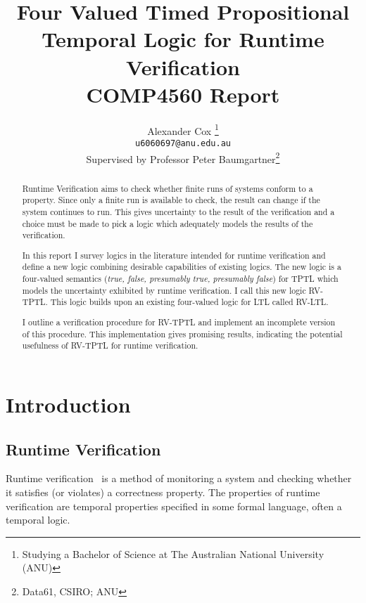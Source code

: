 \documentclass[a4paper]{article}
\title{
  Four Valued Timed Propositional Temporal Logic for Runtime Verification\\
  \normalsize{} COMP4560 Report
}
\author{
  Alexander Cox
  \thanks{Studying a Bachelor of Science at The Australian National University (ANU)}\\
  \small\texttt{u6060697@anu.edu.au}\\
  \normalsize{}Supervised by Professor Peter Baumgartner\thanks{Data61, CSIRO\@; ANU}
}
\begin{document}
\lstset{language=Scala,basicstyle=\ttfamily\small,showstringspaces=false,frame=tl,framerule=1pt,captionpos=b}
\maketitle

\begin{abstract} %
  Runtime Verification aims to check whether finite runs of systems conform to a property. Since only a finite run is available to check, the result can change if the system continues to run. This gives uncertainty to the result of the verification and a choice must be made to pick a logic which adequately models the results of the verification.

  In this report I survey logics in the literature intended for runtime verification and define a new logic combining desirable capabilities of existing logics.
  The new logic is a four-valued semantics (\emph{true, false, presumably true, presumably false}) for TPTL which models the uncertainty exhibited by runtime verification. I call this new logic RV-TPTL. This logic builds upon an existing four-valued logic for LTL called RV-LTL.

  I outline a verification procedure for RV-TPTL and implement an incomplete version of this procedure. This implementation gives promising results, indicating the potential usefulness of RV-TPTL for runtime verification.
\end{abstract}
\newpage
\tableofcontents
\newpage

\section{Introduction}
\subsection{Runtime Verification}
Runtime verification~\autocite{colin2005rv} is a method of monitoring a system and checking whether it satisfies (or violates) a correctness property.
The properties of runtime verification are temporal properties specified in some formal language, often a temporal logic.
\end{document}
